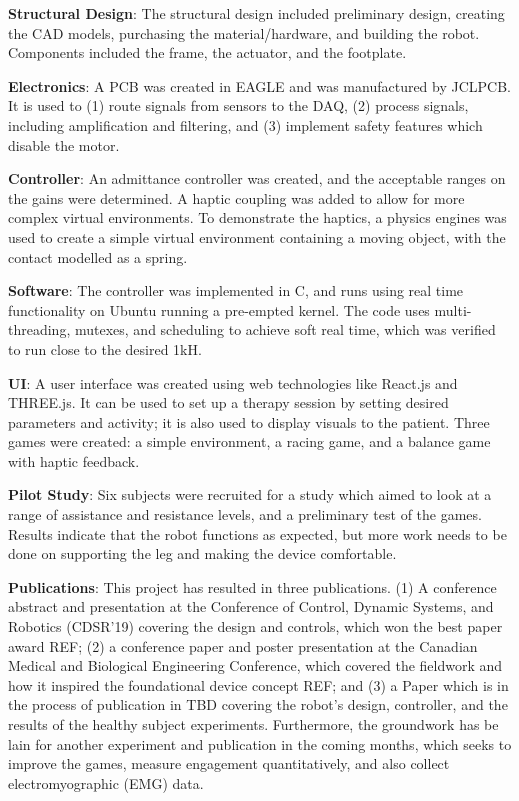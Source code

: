 \documentclass[12pt]{report}
\begin{document}
	\textbf{Structural Design}: The structural design included preliminary design, creating the CAD models, purchasing the material/hardware, and building the robot. Components included the frame, the actuator, and the footplate. 
	
	\textbf{Electronics}: A PCB was created in EAGLE and was manufactured by JCLPCB. It is used to (1) route signals from sensors to the DAQ, (2) process signals, including amplification and filtering, and (3) implement safety features which disable the motor. 
	
	\textbf{Controller}: An admittance controller was created, and the acceptable ranges on the gains were determined. A haptic coupling was added to allow for more complex virtual environments. To demonstrate the haptics, a physics engines was used to create a simple virtual environment containing  a moving object, with the contact modelled as a spring.  
	
	\textbf{Software}: The controller was implemented in C, and runs using real time functionality on Ubuntu running a pre-empted kernel. The code uses multi-threading, mutexes, and scheduling to achieve soft real time, which was verified to run close to the desired 1kH. 
	
	\textbf{UI}: A user interface was created using web technologies like React.js and THREE.js. It can be used to set up a therapy session by setting desired parameters and activity; it is also used to display visuals to the patient. Three games were created: a simple environment, a racing game, and a balance game with haptic feedback. 
	
	\textbf{Pilot Study}: Six subjects were recruited for a study which aimed to look at a range of assistance and resistance levels, and a preliminary test of the games. Results indicate that the robot functions as expected, but more work needs to be done on supporting the leg and making the device comfortable. 
	
	\textbf{Publications}: This project has resulted in three publications. (1) A conference abstract and presentation at the Conference of Control, Dynamic Systems, and Robotics (CDSR'19) covering the design and controls, which won the best paper award REF; (2) a conference paper and poster presentation at the Canadian Medical and Biological Engineering Conference, which covered the fieldwork and how it inspired the foundational device concept REF; and (3) a Paper which is in the process of publication in TBD covering the robot's design, controller, and the results of the healthy subject experiments. Furthermore, the groundwork has be lain for another experiment and publication in the coming months, which seeks to improve the games, measure engagement quantitatively, and also collect electromyographic (EMG) data. 
	
\end{document}
